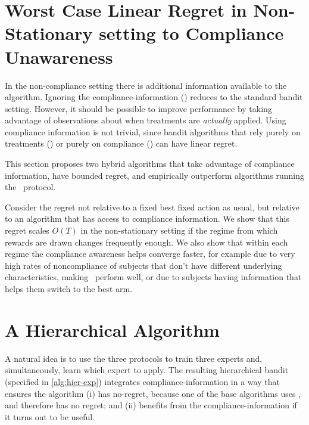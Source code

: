 
\section{Worst Case Linear Regret in Non-Stationary setting to Compliance Unawareness}

In the non-compliance setting there is additional information available to the algorithm. Ignoring the compliance-information (\chosen) reduces to the standard bandit setting. However, it should be possible to improve performance by taking advantage of observations about when treatments are \emph{actually} applied. Using compliance information is not trivial, since bandit algorithms that rely purely on treatments (\actual) or purely on compliance (\comply) can have linear regret.

This section proposes two hybrid algorithms that take advantage of compliance information, have bounded regret, and empirically outperform algorithms running the \chosen\, protocol.


Consider the regret not relative to a fixed best fixed action as usual, but relative to an algorithm that has access to compliance information.%
We show that this regret scales $O(T)$ in the non-stationary setting if the regime from which rewards are drawn changes frequently enough. We also show that within each regime the compliance awareness helps converge faster, for example due to very high rates of noncompliance of subjects that don't have different underlying characteristics, making \actual\, perform well, or due to subjects having information that helps them switch to the best arm.


\section{A Hierarchical Algorithm}

A natural idea is to use the three protocols to train three experts and, simultaneously, learn which expert to apply. The resulting hierarchical bandit (specified in  \ref{alg:hier-exp}) integrates compliance-information in a way that ensures the algorithm (i) has no-regret, because one of the base algorithms uses \chosen, and therefore has no regret; and (ii) benefits from the compliance-information if it turns out to be useful.

